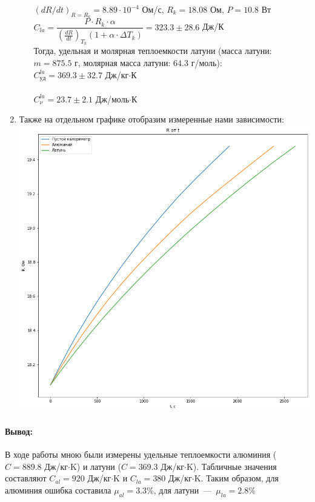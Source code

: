 \documentclass[12pt,a4paper]{article}
\begin{document}
\begin{enumerate}
\begin{itemize}
				$(dR/dt)_{R=R_k} = 8.89 \cdot 10^{-4}$ Ом/с, $R_k = 18.08$ Ом, $P = 10.8$ Вт \\
		$C_{la} = \dfrac{P \cdot R_k \cdot \alpha}{\left( \frac{dR}{dt} \right)_{T_k} \left( 1 + \alpha \cdot \Delta T_k \right)} = 323.3 \pm 28.6$ Дж/К \\
		
				Тогда, удельная и молярная теплоемкости латуни (масса латуни: $m = 875.5$ г, молярная масса латуни: $64.3$ г/моль): \\
				
				$C_{уд}^{la} = 369.3 \pm 32.7$ Дж/кг$\cdot$К \\ \\
				$C_{\nu}^{la} = 23.7 \pm 2.1$ Дж/моль$\cdot$К \\
		\end{itemize}
		
		\item Также на отдельном графике отобразим измеренные нами зависимости: \\
		
		\includegraphics[scale=0.5]{g4.png}		
		
	\end{enumerate}
	
	\paragraph {Вывод:} 
		В ходе работы мною были измерены удельные теплоемкости алюминия ($C = 889.8$ Дж/кг$\cdot$K) и латуни ($C = 369.3$ Дж/кг$\cdot$K). Табличные значения составляют $C_{al} = 920$ Дж/кг$\cdot$K и $C_{la} = 380$ Дж/кг$\cdot$K. Таким образом, для алюминия ошибка составила $\mu_{al} = 3.3 \%$, для латуни~---~$\mu_{la} = 2.8 \%$
\end{document}
